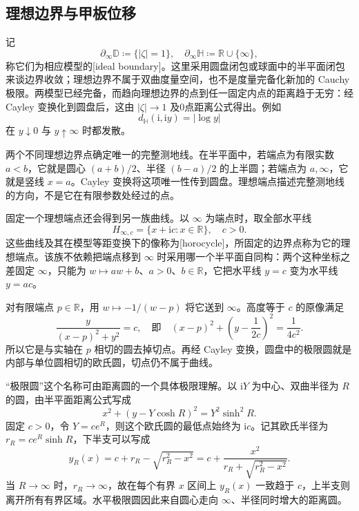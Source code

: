 \subsection{理想边界与甲板位移}
\label{b3:subsec:130304}

记
\[
 \partial_\infty\mathbb D\coloneqq\{|\zeta|=1\},
 \quad
 \partial_\infty\mathbb H\coloneqq\mathbb R\cup\{\infty\},
\]
称它们为相应模型的[ideal boundary]。这里采用圆盘闭包或球面中的半平面闭包来谈边界收敛；理想边界不属于双曲度量空间，也不是度量完备化新加的 Cauchy 极限。两模型已经完备，而趋向理想边界的点到任一固定内点的距离趋于无穷：经 Cayley 变换化到圆盘后，这由 \(|\zeta|\to1\) 及0点距离公式得出。例如
\[
 d_{\mathbb H}(\mathrm i,\mathrm iy)=|\log y|
\]
在 \(y\downarrow0\) 与 \(y\uparrow\infty\) 时都发散。

\ProseParagraphBreak
两个不同理想边界点确定唯一的完整测地线。在半平面中，若端点为有限实数 \(a<b\)，它就是圆心 \((a+b)/2\)、半径 \((b-a)/2\) 的上半圆；若端点为 \(a,\infty\)，它就是竖线 \(x=a\)。Cayley 变换将这项唯一性传到圆盘。理想端点描述完整测地线的方向，不是它在有限参数处经过的点。

\ProseParagraphBreak
固定一个理想端点还会得到另一族曲线。以 \(\infty\) 为端点时，取全部水平线
\[
 H_{\infty,c}=\{x+\mathrm ic:x\in\mathbb R\},\quad c>0.
\]
这些曲线及其在模型等距变换下的像称为[horocycle]，所固定的边界点称为它的理想端点。该族不依赖把端点移到 \(\infty\) 时采用哪一个半平面自同构：两个这种坐标之差固定 \(\infty\)，只能为 \(w\mapsto aw+b\)、\(a>0\)、\(b\in\mathbb R\)，它把水平线 \(y=c\) 变为水平线 \(y=ac\)。

\ProseParagraphBreak
对有限端点 \(p\in\mathbb R\)，用 \(w\mapsto-1/(w-p)\) 将它送到 \(\infty\)。高度等于 \(c\) 的原像满足
\[
 \frac{y}{(x-p)^2+y^2}=c,
 \quad\text{即}\quad
 (x-p)^2+\left(y-\frac1{2c}\right)^2=\frac1{4c^2}.
\]
所以它是与实轴在 \(p\) 相切的圆去掉切点。再经 Cayley 变换，圆盘中的极限圆就是内部与单位圆相切的欧氏圆，切点仍不属于曲线。

\ProseParagraphBreak
“极限圆”这个名称可由距离圆的一个具体极限理解。以 \(\mathrm iY\) 为中心、双曲半径为 \(R\) 的圆，由半平面距离公式写成
\[
 x^2+(y-Y\cosh R)^2=Y^2\sinh^2R.
\]
固定 \(c>0\)，令 \(Y=ce^R\)，则这个欧氏圆的最低点始终为 \(\mathrm ic\)。记其欧氏半径为 \(r_R=ce^R\sinh R\)，下半支可以写成
\[
 y_R(x)=c+r_R-\sqrt{r_R^2-x^2}
 =c+\frac{x^2}{r_R+\sqrt{r_R^2-x^2}}.
\]
当 \(R\to\infty\) 时，\(r_R\to\infty\)，故在每个有界 \(x\) 区间上 \(y_R(x)\) 一致趋于 \(c\)，上半支则离开所有有界区域。水平极限圆因此来自圆心走向 \(\infty\)、半径同时增大的距离圆。

